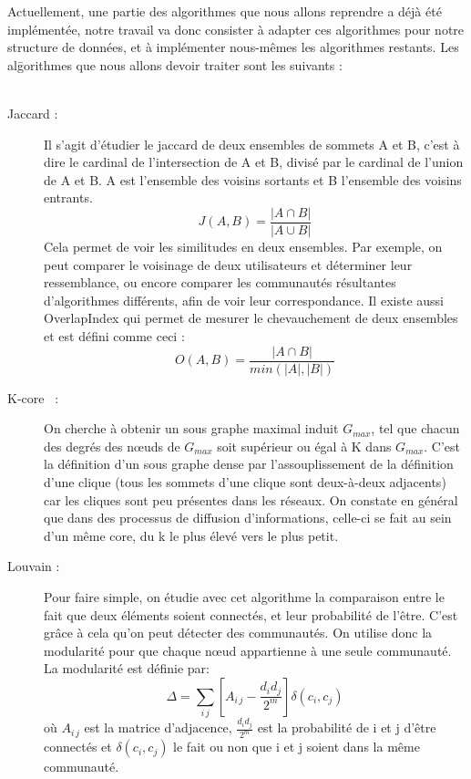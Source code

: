 \begin{titlepage}
\vspace{1cm}
{
Actuellement, une partie des algorithmes que nous allons reprendre a déjà été implémentée, notre travail va donc consister à adapter ces algorithmes pour notre structure de données, et à implémenter nous-mêmes les algorithmes restants. 
Les al\=gorithmes que nous allons devoir traiter sont les suivants : \\ \\
	
\begin{description}
\item[Jaccard :] Il s'agit d'étudier le jaccard \cite{jaccard} de deux ensembles de sommets A et B, c'est à dire le cardinal de l'intersection de A et B, divisé par le cardinal de l'union de A et B. A est l'ensemble des voisins sortants et B l'ensemble des voisins entrants. \[J(A,B) = \frac{|A \cap B|}{|A \cup B|}\] Cela permet de voir les similitudes en deux ensembles. Par exemple, on peut comparer le voisinage de deux utilisateurs et déterminer leur ressemblance, ou encore comparer les communautés résultantes d'algorithmes différents, afin de voir leur correspondance. Il existe aussi OverlapIndex qui permet de mesurer le chevauchement de deux ensembles et est défini comme ceci : \[O(A,B) = \frac{|A \cap B|}{min(|A|,|B|)}\]
\item[K-core~\cite{alvarezhamelin} :] On cherche à obtenir un sous graphe maximal induit $G_{max}$, tel que chacun des degrés des nœuds de $G_{max}$ soit supérieur ou égal à K dans $G_{max}$. C'est la définition d'un sous graphe dense par l'assouplissement de la définition d'une clique (tous les sommets d'une clique sont deux-à-deux adjacents) car les cliques sont peu présentes dans les réseaux. On constate en général que dans des processus de diffusion d'informations, celle-ci se fait au sein d'un même core, du k le plus élevé vers le plus petit.
\newline
\item[Louvain :] Pour faire simple, on étudie avec cet algorithme la comparaison entre le fait que deux éléments  soient connectés, et leur probabilité de l'être. C'est grâce à cela qu'on peut détecter des communautés. On utilise donc la modularité pour que chaque nœud appartienne à une seule communauté. La modularité est définie par: \[\Delta=\sum_{i\,j}\left[ A_{i\,j}-\frac{d_i d_j}{2^m}\right] \delta\left(c_i , c_j \right)\] où $A_{i\,j}$ est la matrice d'adjacence, $\frac{d_i d_j}{2^m}$ est la probabilité de i et j d'être connectés et $\delta(c_i , c_j)$ le fait ou non que i et j soient dans la même communauté.


\end{description}}
\end{titlepage}
